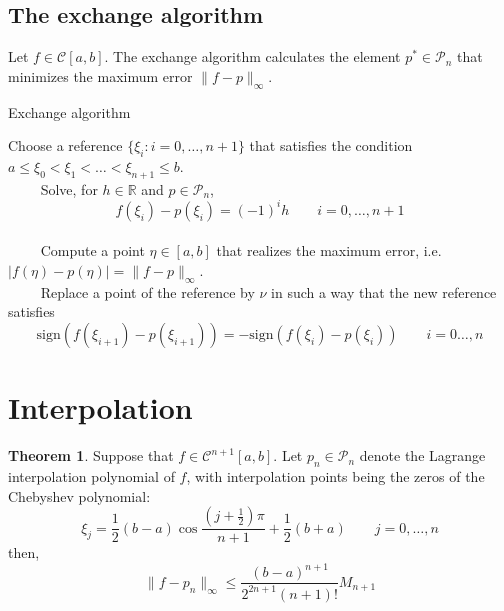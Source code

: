 \documentclass[12pt, openany]{report}
\newcommand{\R}{\mathbb{R}}
\theoremstyle{definition}
\newtheorem{thm}{Theorem}[chapter]
\begin{document}
\subsection{The exchange algorithm}
Let $f\in \mathcal{C}[a,b]$. The exchange algorithm calculates the element $p^*\in \mathcal{P}_n$ that minimizes the maximum error $\lVert f-p\rVert_\infty$.
\begin{algorithm}
    \caption{Exchange algorithm} \label{algo:exchange}
    \begin{algorithmic}[1]
        \State Choose a reference $\{\xi_i : i=0,\dots,n+1\}$ that satisfies the condition $a\le \xi_0<\xi_1<\dots<\xi_{n+1}\le b$.
        \\
        $\qquad$ Solve, for $h\in \R$ and $p\in \mathcal{P}_n$, 
        \begin{equation}
            f(\xi_i)-p(\xi_i)=(-1)^i h\qquad i=0,\dots,n+1
        \end{equation} \\
        $\qquad$ Compute a point $\eta \in [a,b]$ that realizes the maximum error, i.e. $|f(\eta)-p(\eta)| = \lVert f-p\rVert_\infty$.\\
        $\qquad$ Replace a point of the reference by $\nu$ in such a way that the new reference satisfies 
        \begin{equation}
            \text{sign}(f(\xi_{i+1})-p(\xi_{i+1})) = -\text{sign}(f(\xi_i)-p(\xi_i)) \qquad i=0\dots, n
        \end{equation}	
    \EndWhile 
    \end{algorithmic}
\end{algorithm}

\section{Interpolation}
\begin{thm}
    Suppose that $f\in \mathcal{C}^{n+1}[a,b]$. Let $p_n\in \mathcal{P}_n$ denote the Lagrange interpolation polynomial of $f$, with interpolation points being the zeros of the Chebyshev polynomial:
    \begin{equation}
        \xi_j = \frac{1}{2}(b-a)\cos\frac{(j+\frac{1}{2})\pi}{n+1} + \frac{1}{2}(b+a)\qquad j=0,\dots,n
    \end{equation}
    then, 
    \begin{equation}
        \lVert f-p_n\rVert_\infty\le \frac{(b-a)^{n+1}}{2^{2n+1}(n+1)!} M_{n+1}
    \end{equation}
\end{thm}
\end{document}

